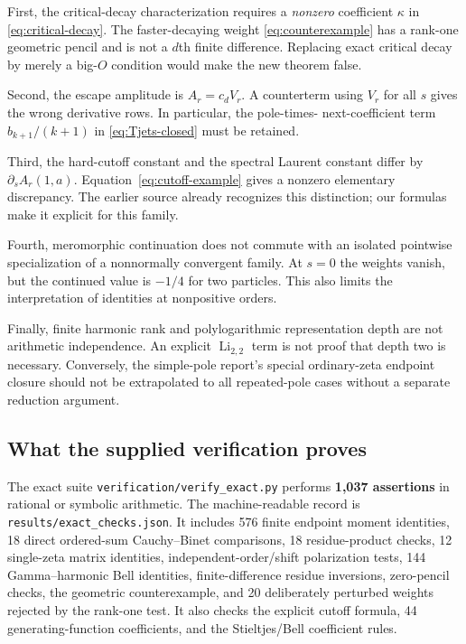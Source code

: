 \documentclass[11pt,letterpaper]{article}
\numberwithin{equation}{section}
\theoremstyle{definition}\newtheorem{definition}[theorem]{Definition}
\theoremstyle{remark}\newtheorem{remark}[theorem]{Remark}
\DeclareMathOperator{\Li}{Li}
\begin{document}
First, the critical-decay characterization requires a \emph{nonzero}
coefficient $\kappa$ in \eqref{eq:critical-decay}. The faster-decaying
weight \eqref{eq:counterexample} has a rank-one geometric pencil and is
not a $d$th finite difference. Replacing exact critical decay by merely
a big-$O$ condition would make the new theorem false.

Second, the escape amplitude is $A_r=c_dV_r$. A counterterm using $V_r$
for all $s$ gives the wrong derivative rows. In particular, the pole-times-
next-coefficient term $b_{k+1}/(k+1)$ in
\eqref{eq:Tjets-closed} must be retained.

Third, the hard-cutoff constant and the spectral Laurent constant differ
by $\partial_sA_r(1,a)$. Equation~\eqref{eq:cutoff-example} gives a
nonzero elementary discrepancy. The earlier source already recognizes
this distinction; our formulas make it explicit for this family.

Fourth, meromorphic continuation does not commute with an isolated
pointwise specialization of a nonnormally convergent family. At $s=0$
the weights vanish, but the continued value is $-1/4$ for two particles.
This also limits the interpretation of identities at nonpositive orders.

Finally, finite harmonic rank and polylogarithmic representation depth
are not arithmetic independence. An explicit $\Li_{2,2}$ term is not
proof that depth two is necessary. Conversely, the simple-pole report's
special ordinary-zeta endpoint closure should not be extrapolated to
all repeated-pole cases without a separate reduction argument.

\subsection{What the supplied verification proves}
The exact suite \texttt{verification/verify\_exact.py} performs
\textbf{1,037 assertions} in rational or symbolic arithmetic. The
machine-readable record is \texttt{results/exact\_checks.json}.
It includes 576 finite endpoint moment identities, 18 direct ordered-sum
Cauchy--Binet comparisons, 18 residue-product checks, 12 single-zeta
matrix identities, independent-order/shift polarization tests, 144
Gamma--harmonic Bell identities, finite-difference residue inversions,
zero-pencil checks, the geometric counterexample, and 20 deliberately
perturbed weights rejected by the rank-one test. It also checks the
explicit cutoff formula, 44 generating-function coefficients, and the
Stieltjes/Bell coefficient rules.
\end{document}
